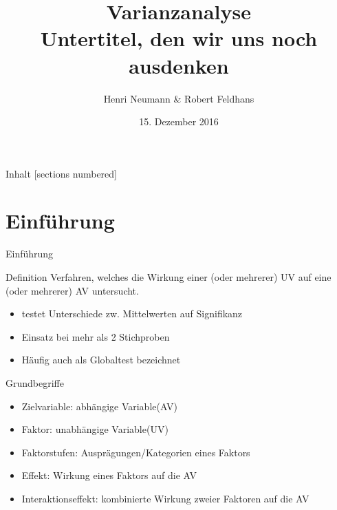 \documentclass{beamer}
\title{Varianzanalyse\\\normalsize Untertitel, den wir uns noch ausdenken}%
\date{15. Dezember 2016}
\author{Henri Neumann \& Robert Feldhans}
\institute{Experimentelle Psychologie für Nichtpsychologen}
\begin{document}
	\maketitle
	
	\begin{frame}{Inhalt}
		[sections numbered]
		\tableofcontents[hideallsubsections]
	\end{frame}
	
	\section{Einführung}
	
	\begin{frame}{Einführung}
		
		\begin{block}{Definition}
			Verfahren, welches die Wirkung einer (oder mehrerer) UV auf eine (oder mehrerer) AV untersucht.
		\end{block}
		\begin{itemize}
			\item testet Unterschiede zw. Mittelwerten auf Signifikanz
			\item Einsatz bei mehr als 2 Stichproben
			\item Häufig auch als Globaltest bezeichnet
		\end{itemize}
		
	\end{frame}
	
	
	\begin{frame}{Grundbegriffe }
		\begin{itemize}
			\item Zielvariable: abhängige Variable(AV) 
			\item Faktor: unabhängige Variable(UV) 
			\item Faktorstufen: Ausprägungen/Kategorien eines Faktors 
			\item Effekt: Wirkung eines Faktors auf die AV
			\item Interaktionseffekt: kombinierte Wirkung zweier Faktoren auf die AV
		\end{itemize}
	\end{frame}
	
\end{document}
